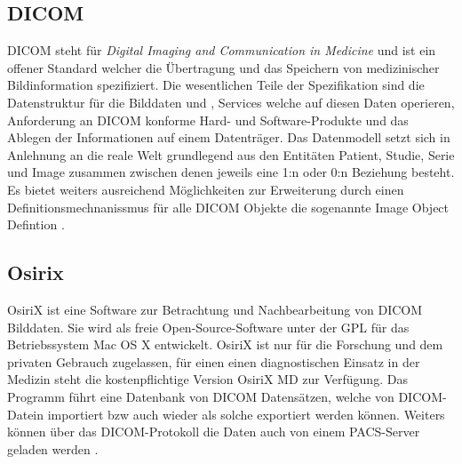 \subsection{DICOM}
\label{sec:DICOM}
DICOM steht für \emph{Digital Imaging and Communication in Medicine} und ist ein offener Standard welcher die Übertragung und das Speichern von medizinischer Bildinformation spezifiziert.
Die wesentlichen Teile der Spezifikation sind die Datenstruktur für die Bilddaten und  , 
Services welche auf diesen Daten operieren, Anforderung an DICOM konforme Hard- und Software-Produkte und das Ablegen der Informationen auf einem Datenträger.
Das Datenmodell setzt sich in Anlehnung an die reale Welt grundlegend aus den Entitäten Patient, Studie, Serie und Image zusammen zwischen denen jeweils eine 1:n oder 0:n Beziehung besteht.
Es bietet weiters ausreichend Möglichkeiten zur Erweiterung durch einen Definitionsmechnanissmus für alle DICOM Objekte die sogenannte Image Object Defintion \cite{pacs}.

\subsection{Osirix}
\label{sec:Osirix}
OsiriX ist eine Software zur Betrachtung und Nachbearbeitung von DICOM Bilddaten.
Sie wird als freie Open-Source-Software unter der GPL für das Betriebssystem Mac OS X entwickelt.
OsiriX ist nur für die Forschung und dem privaten Gebrauch zugelassen, 
für einen einen diagnostischen Einsatz in der Medizin steht die kostenpflichtige Version OsiriX MD zur Verfügung.
%
Das Programm führt eine Datenbank von DICOM Datensätzen, 
welche von DICOM-Datein importiert bzw auch wieder als solche exportiert werden können.
Weiters können über das DICOM-Protokoll die Daten auch von einem PACS-Server geladen werden \cite{osirix}.

